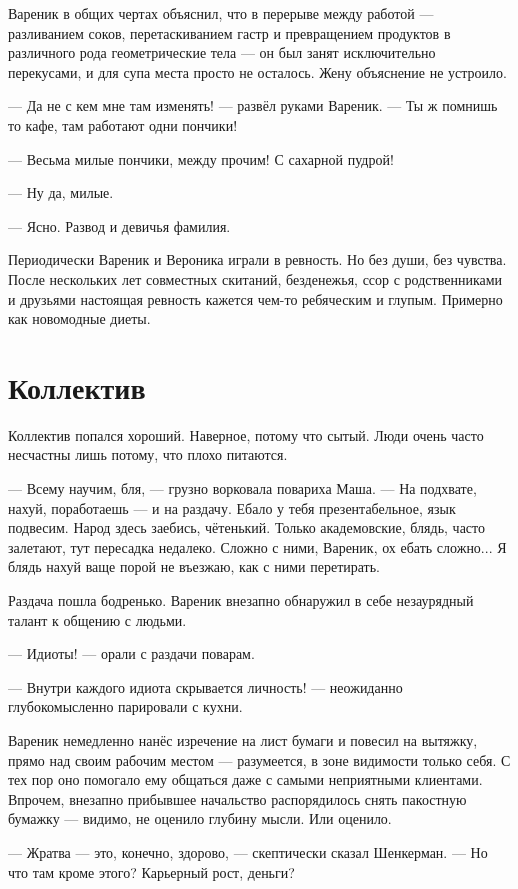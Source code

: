 \documentclass[a4paper,10pt,fleqn]{book}\usepackage{polyglossia}\setdefaultlanguage{english}\setotherlanguage{russian}\defaultfontfeatures{Ligatures=TeX,Mapping=tex-text} \usepackage{xcolor}\definecolor{lightgray}{HTML}{bbbbbb}\color{lightgray}\newcommand{\ml}[3]{\textcolor{black}{#3}}
\newcommand{\textspace}{\vspace{1em}{\centering\Large\bfseries<...>\par}\vspace{1em}}
\begin{document}
Вареник в общих чертах объяснил, что в перерыве между работой --- разливанием соков, перетаскиванием гастр и превращением продуктов в различного рода геометрические тела --- он был занят исключительно перекусами, и для супа места просто не осталось.
Жену объяснение не устроило.

--- Да не с кем мне там изменять! --- развёл руками Вареник.
--- Ты ж помнишь то кафе, там работают одни пончики!

--- Весьма милые пончики, между прочим!
С сахарной пудрой!

--- Ну да, милые.

--- Ясно.
Развод и девичья фамилия.

Периодически Вареник и Вероника играли в ревность.
Но без души, без чувства.
После нескольких лет совместных скитаний, безденежья, ссор с родственниками и друзьями настоящая ревность кажется чем-то ребяческим и глупым.
Примерно как новомодные диеты.

\section{Коллектив}

Коллектив попался хороший.
Наверное, потому что сытый.
Люди очень часто несчастны лишь потому, что плохо питаются.

--- Всему научим, бля, --- грузно ворковала повариха Маша.
--- На подхвате, нахуй, поработаешь --- и на раздачу.
Ебало у тебя презентабельное, язык подвесим.
Народ здесь заебись, чётенький.
Только академовские, блядь, часто залетают, тут пересадка недалеко.
Сложно с ними, Вареник, ох ебать сложно...
Я блядь нахуй ваще порой не въезжаю, как с ними перетирать.

Раздача пошла бодренько.
Вареник внезапно обнаружил в себе незаурядный талант к общению с людьми.

--- Идиоты! --- орали с раздачи поварам.

--- Внутри каждого идиота скрывается личность! --- неожиданно глубокомысленно парировали с кухни.

Вареник немедленно нанёс изречение на лист бумаги и повесил на вытяжку, прямо над своим рабочим местом --- разумеется, в зоне видимости только себя.
С тех пор оно помогало ему общаться даже с самыми неприятными клиентами.
Впрочем, внезапно прибывшее начальство распорядилось снять пакостную бумажку --- видимо, не оценило глубину мысли.
Или оценило.

\textspace

--- Жратва --- это, конечно, здорово, --- скептически сказал Шенкерман.
--- Но что там кроме этого?
Карьерный рост, деньги?
\end{document}
